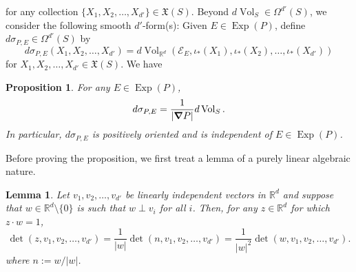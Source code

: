 \documentclass[11pt]{article}
\newtheorem{lemma}[theorem]{Lemma}
\newtheorem{proposition}[theorem]{Proposition}
\theoremstyle{remark}
\newcommand\Exp{\operatorname{Exp}}
\renewcommand\det{\operatorname{det}}
\newcommand{\Vol}{\operatorname{Vol}}
\begin{document}
for any collection $\{X_1,X_2,\dots,X_{d'}\}\in \mathfrak{X}(S)$. Beyond $d\Vol_S\in \Omega^{d'}(S)$, we consider the following smooth $d'$-form(s): Given $E\in \Exp(P)$, define $d\sigma_{P,E}\in\Omega^{d'}(S)$ by
\begin{equation*}
    d\sigma_{P,E}(X_1,X_2,\dots,X_{d'})=d\Vol_{\mathbb{R}^d}(\mathcal{E}_E,\iota_*(X_1),\iota_*(X_2),\dots,\iota_*(X_{d'}))
\end{equation*}
for $X_1,X_2,\dots,X_{d'}\in\mathfrak{X}(S)$. We have
\begin{proposition}\label{prop:FormRiemannRelation}
For any $E\in\Exp(P)$,
\begin{equation*}
    d\sigma_{P,E}=\frac{1}{|\grad P|}d\Vol_S.
\end{equation*}
In particular, $d\sigma_{P,E}$ is positively oriented and is independent of $E\in\Exp(P)$.
\end{proposition}
\noindent Before proving the proposition, we first treat a lemma of a purely linear algebraic nature. 
\begin{lemma}\label{lem:determinants}
Let $v_1,v_2,\dots,v_{d'}$ be linearly independent vectors in $\mathbb{R}^d$ and suppose that $w\in\mathbb{R}^d \setminus\{0\}$ is such that $w\perp v_i$ for all $i$. Then, for any $z\in\mathbb{R}^d$ for which $z\cdot w=1$,
\begin{equation*}
\det(z, v_1,v_2,\dots,v_{d'})=\frac{1}{|w|}\det(n,v_1,v_2,\dots,v_{d'})=\frac{1}{|w|^2}\det(w,v_1,v_2,\dots,v_{d'}).
\end{equation*}
where $n:=w/|w|$.
\end{lemma}
\end{document}
